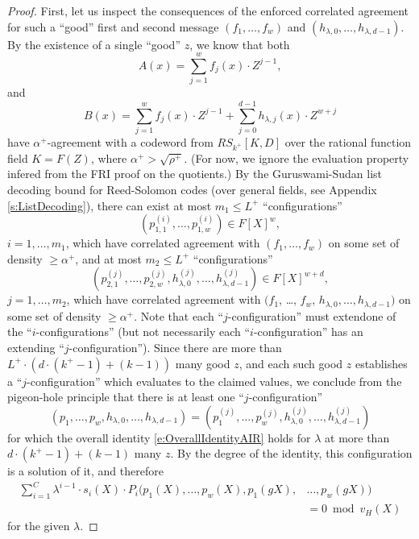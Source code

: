 \documentclass[11pt,article,oneside]{memoir}
\theoremstyle{definition}
\theoremstyle{remark}
\begin{document}
\begin{proof}
First, let us inspect the consequences of the enforced correlated agreement for such a “good” first and second message $(f_1,\ldots,f_w)$ and $(h_{\lambda,0},\ldots,h_{\lambda,d-1})$.
By the existence of a single ``good'' $z$, we know that both
\[
A(x)= \sum_{j=1}^w f_j(x)\cdot Z^{j-1},
\]
and
\[
B(x)= \sum_{j=1}^w f_j(x)\cdot Z^{j-1} + \sum_{j=0}^{d-1} h_{\lambda, j}(x) \cdot Z^{w+j}
\] 
have $\alpha^+$-agreement with a codeword from $RS_{k^+}[K,D]$ over the rational function field $K=F(Z)$, where $\alpha^+ > \sqrt{\rho^+}$.
(For now, we ignore the evaluation property infered from the FRI proof on the quotients.)
By the Guruswami-Sudan list decoding bound for Reed-Solomon codes (over general fields, see Appendix \ref{s:ListDecoding}), there can exist at most $m_1\leq L^+$  “configurations”
\[
 \left(p_{1,1}^{(i)}, \ldots, p_{1,w}^{(i)} \right) \in F[X]^w, 
\]
$i=1,\ldots, m_1$, which have correlated agreement with $(f_1,\ldots, f_w)$ on some set of density $\geq \alpha^+$, 
and at most $m_2 \leq L^+$ ``configurations''
\[
\left(p_{2,1}^{(j)}, \ldots, p_{2,w}^{(j)}, h_{\lambda,0}^{(j)}, \ldots , h_{\lambda, d-1}^{(j)} \right)\in F[X]^{w+d}, 
\]
$j=1,\ldots,m_2$, which have correlated agreement with $(f_1$, \ldots, $f_w$, $h_{\lambda,0}, \ldots, h_{\lambda, d-1})$ on some set of density $\geq \alpha^+$.
%
Note that each ``$j$-configuration'' must extend\footnotemark one of the ``$i$-configurations'' (but not necessarily each ``$i$-configuration'' has an extending ``$j$-configuration'').
%
%
Since there are  more than $L^+\cdot \left(d\cdot (k^+ - 1) + (k - 1)\right)$ many good $z$, and each such good $z$ establishes a ``$j$-configuration'' which evaluates to the claimed values, we conclude from the pigeon-hole principle that there is at least one ``$j$-configuration'' 
\[
(p_1,\ldots, p_w, h_{\lambda, 0}, \ldots, h_{\lambda,d-1}) = \left(p_1^{(j)},\ldots, p_w^{(j)},h_{\lambda,0}^{(j)}, \ldots , h_{\lambda, d-1}^{(j)} \right)
\] 
for which the overall identity \eqref{e:OverallIdentityAIR} holds for $\lambda$ at more than $d\cdot (k^+-1) + (k - 1)$ many $z$. 
By the degree of the identity, this configuration is a solution of it, and therefore
\begin{equation}
\label{e:OverallIdentityAIRmodH}
\begin{aligned}
\sum_{i=1}^{C} \lambda^{i-1}\cdot s_i(X)\cdot P_i(p_1(X), \ldots, p_w(X), p_1(gX),& \ldots, p_w(g X)) 
\\
&= 0 \bmod v_H(X)
\end{aligned}
\end{equation}
for the given $\lambda$.


\end{proof}
\end{document}
